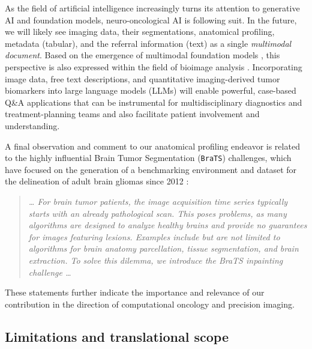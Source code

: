 \documentclass[a4paper,11pt,leqno]{article}
\begin{document}
As the field of artificial intelligence increasingly turns its attention
to generative AI and foundation models, neuro-oncological AI is following suit.
In the future, we will likely see
imaging data, their segmentations, anatomical profiling, metadata (tabular), and
the referral information (text) as a single \emph{multimodal document}.
Based on the emergence of multimodal foundation models %
\cite{Moor2023}, this perspective is also expressed within the field of bioimage
analysis \cite{Ma2023, Royer2023}. %
Incorporating image data, free
text descriptions, and quantitative imaging-derived tumor biomarkers into large language models (LLMs) will enable powerful,
case-based Q\&A applications that can be instrumental for
multidisciplinary diagnostics and treatment-planning teams
\cite{Cao2021}  %
and also facilitate patient involvement and understanding.

\vspace{3mm}

A final observation and comment to our anatomical profiling endeavor is related to the highly
influential Brain Tumor Segmentation (\texttt{BraTS}) challenges, which have
focused on the generation of a benchmarking environment and dataset for
the delineation of adult brain gliomas since 2012 \cite{Menze2021, Menze2015}:
\begin{normalsize}
\begin{quote}
\emph{\ldots{} For brain tumor patients, the image acquisition time
series typically starts with an already pathological scan. This poses
problems, as many algorithms are designed to analyze healthy brains and
provide no guarantees for images featuring lesions. Examples include but
are not limited to algorithms for brain anatomy parcellation, tissue
segmentation, and brain extraction. To solve this dilemma, we introduce
the BraTS inpainting challenge \ldots{}}
\end{quote}
\end{normalsize}

These statements further indicate the importance and relevance of our
contribution in the direction of computational oncology and precision
imaging.

\subsection*{Limitations and translational scope}
\end{document}
